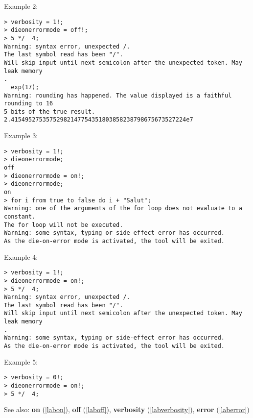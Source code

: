 \noindent Example 2: 
\begin{center}\begin{minipage}{15cm}\begin{Verbatim}[frame=single,commandchars=\\\|\~]
> verbosity = 1!;
> dieonerrormode = off!;
> 5 */  4;
Warning: syntax error, unexpected /.
The last symbol read has been "/".
Will skip input until next semicolon after the unexpected token. May leak memory
.
  exp(17);
Warning: rounding has happened. The value displayed is a faithful rounding to 16
5 bits of the true result.
2.41549527535752982147754351803858238798675673527224e7
\end{Verbatim}
\end{minipage}\end{center}
\noindent Example 3: 
\begin{center}\begin{minipage}{15cm}\begin{Verbatim}[frame=single,commandchars=\\\|\~]
> verbosity = 1!;
> dieonerrormode;
off
> dieonerrormode = on!;
> dieonerrormode;
on
> for i from true to false do i + "Salut";
Warning: one of the arguments of the for loop does not evaluate to a constant.
The for loop will not be executed.
Warning: some syntax, typing or side-effect error has occurred.
As the die-on-error mode is activated, the tool will be exited.
\end{Verbatim}
\end{minipage}\end{center}
\noindent Example 4: 
\begin{center}\begin{minipage}{15cm}\begin{Verbatim}[frame=single,commandchars=\\\|\~]
> verbosity = 1!;
> dieonerrormode = on!;
> 5 */  4;
Warning: syntax error, unexpected /.
The last symbol read has been "/".
Will skip input until next semicolon after the unexpected token. May leak memory
.
Warning: some syntax, typing or side-effect error has occurred.
As the die-on-error mode is activated, the tool will be exited.
\end{Verbatim}
\end{minipage}\end{center}
\noindent Example 5: 
\begin{center}\begin{minipage}{15cm}\begin{Verbatim}[frame=single,commandchars=\\\|\~]
> verbosity = 0!;
> dieonerrormode = on!;
> 5 */  4;
\end{Verbatim}
\end{minipage}\end{center}
See also: \textbf{on} (\ref{labon}), \textbf{off} (\ref{laboff}), \textbf{verbosity} (\ref{labverbosity}), \textbf{error} (\ref{laberror})
